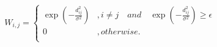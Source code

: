 \documentclass{article}
\begin{document}
\begin{equation}
  W_{i,j} = \left\{
    \begin{array}{ll}
      \exp(-\frac{d^{2}_{ij}}{\sigma^{2}}) & , i \neq j \quad and \quad \exp(-\frac{d^{2}_{ij}}{\sigma^{2}}) \geq \epsilon \\
      0 & , otherwise. \\
    \end{array}\right.
\end{equation}



\end{document}
